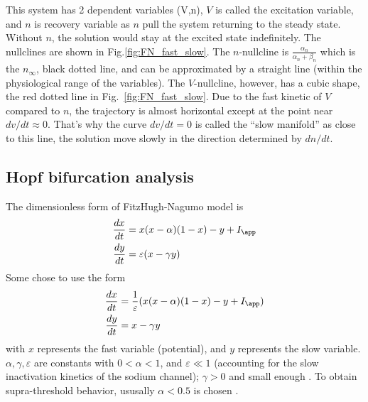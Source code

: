 This system has 2 dependent variables (V,n), $V$ is called the excitation
variable, and $n$ is recovery variable as $n$ pull the system returning to the
steady state. Without $n$, the solution would stay at the excited state
indefinitely. The nullclines are shown in Fig.\ref{fig:FN_fast_slow}. The
$n$-nullcline is $\frac{\alpha_n}{\alpha_n+\beta_n}$ which is the $n_\infty$,
black dotted line, and can be approximated by a straight line (within the
physiological range of the variables).
The $V$-nullcline, however, has a cubic shape, the red dotted line in
Fig.~\ref{fig:FN_fast_slow}.
Due to the fast kinetic of $V$ compared to $n$, the trajectory is almost
horizontal except at the point near $dv/dt\approx 0$.
That's why the curve $dv/dt=0$ is called the ``slow manifold'' as close to this
line, the solution move slowly in the direction determined by $dn/dt$.


  


\subsection{Hopf bifurcation analysis}


The dimensionless form of FitzHugh-Nagumo model is
\begin{equation}
\label{eq:FH-N}
\begin{split}
\frac{dx}{dt} &= x(x-\alpha)(1-x) - y + I_\app \\
\frac{dy}{dt} &= \varepsilon (x-\gamma y)
\end{split}
\end{equation}
Some chose to use the form
\begin{equation}
\begin{split}
\frac{dx}{dt} &= \frac{1}{\varepsilon}(x(x-\alpha)(1-x) - y + I_\app) \\
\frac{dy}{dt} &= x-\gamma y
\end{split}
\end{equation}
with $x$ represents the fast variable (potential), and $y$ represents the slow
variable. $\alpha, \gamma, \varepsilon$ are constants with $0<\alpha<1$, and
$\varepsilon \ll 1$ (accounting for the slow inactivation kinetics of the
sodium channel); $\gamma > 0$ and small enough \citep{rinzel1990prop}. To obtain
supra-threshold behavior, ususally $\alpha< 0.5$ is chosen \citep{tuckwel2003}.


